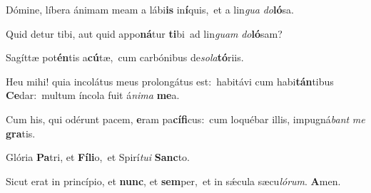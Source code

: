 \vs Dómine, líbera ánimam meam a lábi\textbf{is} in\textbf{í}quis,~\redgreheightstar et a lin\textit{gua} \textit{do}\textbf{ló}sa.

\vs Quid detur tibi, aut quid appo\textbf{ná}tur \textbf{ti}bi~\redgreheightstar ad lin\textit{guam} \textit{do}\textbf{ló}sam?

\vs Sagíttæ pot\textbf{én}tis a\textbf{cú}tæ,~\redgreheightstar cum carbónibus de\textit{so}\textit{la}\textbf{tó}riis.

\vs Heu mihi! quia incolátus meus prolongátus est:~\reddagger habitávi cum habi\-\textbf{tán}\-ti\-bus \textbf{Ce}dar:~\redgreheightstar multum íncola fuit á\textit{ni}\textit{ma} \textbf{me}a.

\vs Cum his, qui odérunt pacem, \textbf{e}ram pa\textbf{cí}\textbf{fi}cus:~\redgreheightstar cum loquébar illis, impugná\textit{bant} \textit{me} \textbf{gra}tis.

\vs Glória \textbf{Pa}tri, et \textbf{Fí}\textbf{li}o,~\redgreheightstar et Spirí\textit{tu}\textit{i} \textbf{Sanc}to.

\vs Sicut erat in princípio, et \textbf{nunc}, et \textbf{sem}per,~\redgreheightstar et in sǽcula sæcu\textit{ló}\textit{rum}. \textbf{A}men.


